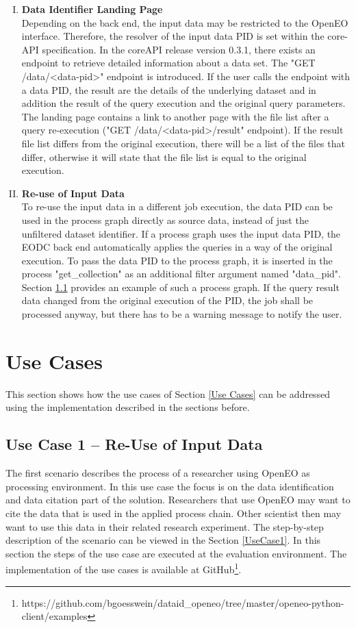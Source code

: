 \documentclass[draft,final]{vutinfth} %
\begin{document}
\begin{enumerate}[I.]
\item \textbf{Data Identifier Landing Page} \\
	Depending on the back end, the input data may be restricted to the OpenEO interface. Therefore, the resolver of the input data PID is set within the core-API specification. In the coreAPI release version 0.3.1, there exists an endpoint to retrieve detailed information about a data set. The "GET /data/<data-pid>" endpoint is introduced. If the user calls the endpoint with a data PID, the result are the details of the underlying dataset and in addition the result of the query execution and the original query parameters. The landing page contains a link to another page with the file list after a query re-execution ("GET /data/<data-pid>/result" endpoint). If the result file list differs from the original execution, there will be a list of the files that differ, otherwise it will state that the file list is equal to the original execution. 

\item \textbf{Re-use of Input Data} \\
	To re-use the input data in a different job execution, the data PID can be used in the process graph directly as source data, instead of just the unfiltered dataset identifier. If a process graph uses the input data PID, the EODC back end automatically applies the queries in a way of the original execution. To pass the data PID to the process graph, it is inserted in the process "get\_collection" as an additional filter argument named "data\_pid". Section \ref{Implementation:Use Case1} provides an example of such a process graph. If the query result data changed from the original execution of the PID, the job shall be processed anyway, but there has to be a warning message to notify the user.  
\end{enumerate}
\section{Use Cases}
This section shows how the use cases of Section \ref{Use Cases} can be addressed using the implementation described in the sections before.

\subsection{Use Case 1 – Re-Use of Input Data}\label{Implementation:Use Case1}
The first scenario describes the process of a researcher using OpenEO as processing environment. In this use case the focus is on the data identification and data citation part of the solution. Researchers that use OpenEO may want to cite the data that is used in the applied process chain. Other scientist then may want to use this data in their related research experiment. The step-by-step description of the scenario can be viewed in the Section \ref{UseCase1}. In this section the steps of the use case are executed at the evaluation environment. The implementation of the use cases is available at GitHub\footnote{https://github.com/bgoesswein/dataid\_openeo/tree/master/openeo-python-client/examples}.
\end{document}
